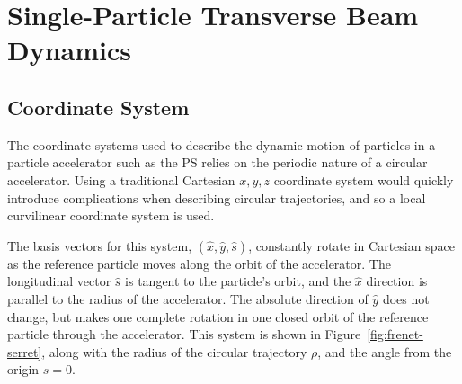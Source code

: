 \documentclass[11pt]{report}
\begin{document}
\section{Single-Particle Transverse Beam Dynamics}

\subsection{Coordinate System}

The coordinate systems used to describe the dynamic motion of particles in a particle accelerator such as the PS relies on the periodic nature of a circular accelerator. Using a traditional Cartesian $x, y, z$ coordinate system would quickly introduce complications when describing circular trajectories, and so a local curvilinear coordinate system is used.

The basis vectors for this system, $(\hat x, \hat y, \hat s)$, constantly rotate in Cartesian space as the reference particle moves along the orbit of the accelerator. The longitudinal vector $\hat s$ is tangent to the particle's orbit, and the $\hat x$ direction is parallel to the radius of the accelerator. The absolute direction of $\hat y$ does not change, but makes one complete rotation in one closed orbit of the reference particle through the accelerator. This system is shown in Figure~\ref{fig:frenet-serret}, along with the radius of the circular trajectory $\rho$, and the angle from the origin $s=0$. 
\end{document}
